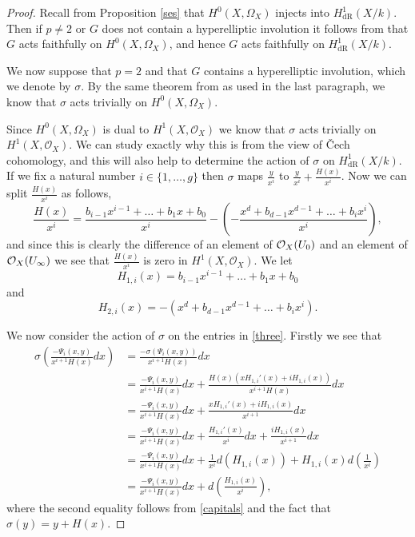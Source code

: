 \documentclass[draft, 11pt]{article} %
\theoremstyle{plain}
\theoremstyle{remark}
\newcommand{\cO}{{\cal O}}
\newcommand{\cech}{\v{C}ech }
\newcommand{\hzero}{{H^0(X,\Omega_X)}}
\newcommand{\hone}{H^1(X,\mathcal{O}_X)}
\newcommand{\derhamhone}{H_{\text {dR}}^1(X/k)}
\begin{document}
\begin{proof}
Recall from Proposition \ref{ses} that $H^0(X,\Omega_X)$ injects into $\derhamhone$.
Then if $p \neq 2$ or $G$ does not contain a hyperelliptic involution it follows from \cite[Thm. 4.2]{faithfulaction} that $G$ acts faithfully on $H^0(X,\Omega_X)$, and hence $G$ acts faithfully on $\derhamhone$.

We now suppose that $p=2$ and that $G$ contains a hyperelliptic involution, which we denote by $\sigma$.
By the same theorem from \cite{faithfulaction} as used in the last paragraph, we know that $\sigma$ acts trivially on $\hzero$.

Since $\hzero$ is dual to $\hone$ we know that $\sigma$ acts trivially on $\hone$.
We can study exactly why this is from the view of \cech cohomology, and this will also help to determine the action of $\sigma$ on $\derhamhone$.
If we fix a natural number $i\in \{1, \ldots ,g\}$ then $\sigma$ maps $\frac{y}{x^i}$ to $\frac{y}{x^i} + \frac{H(x)}{x^i}$. 
Now we can split $\frac{H(x)}{x^i}$ as follows, 
\begin{equation*}
\frac{H(x)}{x^i} =  \frac{b_{i-1}x^{i-1} + \ldots + b_1x + b_0}{x^i} - \left( - \frac{x^d + b_{d-1}x^{d-1} + \ldots + b_ix^i}{x^i} \right),
\end{equation*}
and since this is clearly the difference of an element of $\cO_X(U_0)$ and an element of $\cO_X(U_\infty)$ we see that $\frac{H(x)}{x^i}$ is zero in $\hone$.
We let 
\[
H_{1,i}(x) = b_{i-1}x^{i-1} + \ldots + b_1x + b_0
\]
and 
\[
H_{2,i}(x) = -( x^d + b_{d-1}x^{d-1} + \ldots + b_ix^i).
\]

We now consider the action of $\sigma$ on the entries in \eqref{three}.
Firstly we see that
\begin{align*}
\sigma \left( \frac{-\Psi_i(x,y)}{x^{i+1}H(x)} dx\right) & = \frac{-\sigma(\Psi_i(x,y))}{x^{i+1} H(x)} dx \\
& = \frac{-\Psi_i(x,y)}{x^{i+1}H(x)}dx + \frac{H(x)(xH_{1,i}'(x) + iH_{1,i}(x))}{x^{i+1}H(x)}dx\\
& = \frac{-\Psi_i(x,y)}{x^{i+1}H(x)}dx + \frac{xH_{1,i}'(x) + iH_{1,i}(x)}{x^{i+1}}dx \\
& = \frac{-\Psi_i(x,y)}{x^{i+1}H(x)}dx +  \frac{H_{1,i}'(x)}{x^i}dx + \frac{iH_{1,i}(x)}{x^{i+1}}dx \\
& = \frac{-\Psi_i(x,y)}{x^{i+1}H(x)}dx +  \frac{1}{x^i}d\left( H_{1,i}(x) \right) + H_{1,i}(x) d \left( \frac{1}{x^i} \right) \\
& = \frac{-\Psi_i(x,y)}{x^{i+1}H(x)}dx + d\left( \frac{H_{1,i}(x)}{x^i} \right),
\end{align*}
where the second equality follows from \eqref{capitals} and the fact that $\sigma(y) = y + H(x)$.


\end{proof}
\end{document}
